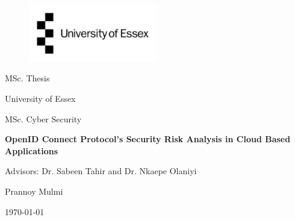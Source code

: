 
\label{titlePage}
\begin{figure}[h]
\centering
\includegraphics[width=0.50\textwidth]{pics/logo.pdf}
\end{figure}
\FloatBarrier

\begin{Large} 
\begin{center}
MSc. Thesis
\end{center}
\end{Large} 

\vspace*{5mm}

\begin{large} 
\begin{center}
University of Essex
\end{center}
\end{large} 

\begin{large} 
\begin{center}
MSc. Cyber Security
\end{center}
\end{large}



\begin{Large} 
\begin{center}
\textbf{OpenID Connect Protocol's Security Risk Analysis in Cloud Based Applications}
\end{center}
\end{Large}

\vspace*{5mm}

\begin{large} 
\begin{center}
Advisors: Dr. Sabeen Tahir and Dr. Nkaepe Olaniyi
\end{center}

\end{large} 

\begin{large} 
\begin{center}
Prannoy Mulmi
\end{center}
\end{large} 



\begin{center}
{\today}
\end{center}

\pagestyle{empty} %

